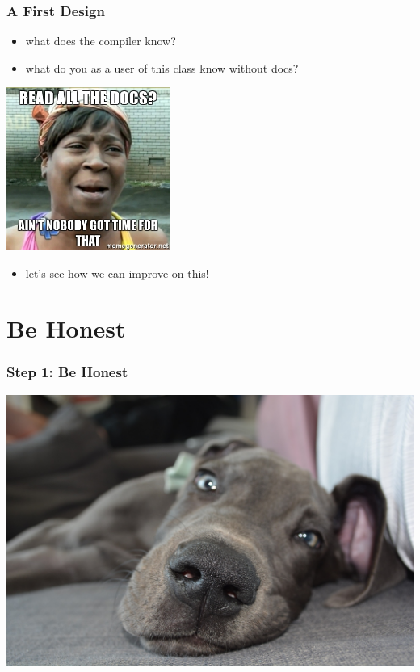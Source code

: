 \documentclass{beamer}
\begin{document}
\begin{frame}
  \inputminted[fontsize=\small, firstline=3]{scala}{../src/main/scala/de/codecentric/zero/VendingMachine.scala}
\end{frame}

\begin{frame}
  \frametitle{A First Design}
  \begin{itemize}
  \item what does the compiler know?
  \item what do you as a user of this class know without docs?
  \end{itemize}
    \begin{center}
    \includegraphics[width=0.4\textwidth]{../pics/docs.jpg}
  \end{center}
  \begin{itemize}
  \item let's see how we can improve on this!
  \end{itemize}

\end{frame}

\section{Be Honest}

\begin{frame}
  \frametitle{Step 1: Be Honest}
  \begin{center}
    \includegraphics[width=\textwidth]{../pics/dog.jpg}
  \end{center}
\end{frame}
\end{document}
